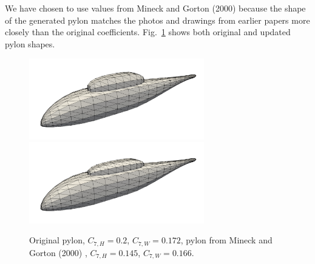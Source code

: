 \documentclass{ahs}
\begin{document}
\begin{itemize}
We have chosen to use values from Mineck and Gorton (2000) \cite{mineckgorton} because the shape of the generated 
pylon matches the photos and drawings from earlier papers more closely \cite{nasa80051,nasa87762} than the original coefficients.
Fig.~\ref{badpylon} shows both original and updated pylon shapes.
\begin{figure} \begin{centering}
\includegraphics[width=3.0in]{img_badpylon.png}
\includegraphics[width=3.0in]{img_good.png}
\caption{Original pylon, $C_{7,H} = 0.2$, $C_{7,W} = 0.172$, pylon from Mineck and Gorton (2000) \cite{mineckgorton}, $C_{7,H} = 0.145$, $C_{7,W} = 0.166$.}
\label{badpylon}
\end{centering}\end{figure}%
\end{itemize}
\end{document}
